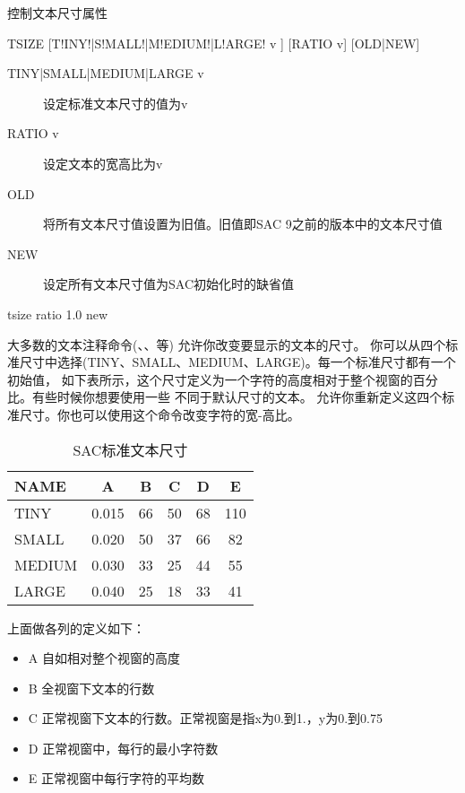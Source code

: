 \label{cmd:tsize}

控制文本尺寸属性

\begin{SACSTX}
TSIZE [T!INY!|S!MALL!|M!EDIUM!|L!ARGE! v ] [RATIO v] [OLD|NEW]
\end{SACSTX}

\begin{description}
\item [TINY|SMALL|MEDIUM|LARGE v] 设定标准文本尺寸的值为v
\item [RATIO v] 设定文本的宽高比为v
\item [OLD] 将所有文本尺寸值设置为旧值。旧值即SAC 9之前的版本中的文本尺寸值
\item [NEW] 设定所有文本尺寸值为SAC初始化时的缺省值
\end{description}

\begin{SACDFT}
tsize ratio 1.0 new
\end{SACDFT}

大多数的文本注释命令(、、等)
允许你改变要显示的文本的尺寸。
你可以从四个标准尺寸中选择(TINY、SMALL、MEDIUM、LARGE)。每一个标准尺寸都有一个初始值，
如下表所示，这个尺寸定义为一个字符的高度相对于整个视窗的百分比。有些时候你想要使用一些
不同于默认尺寸的文本。 允许你重新定义这四个标准尺寸。你也可以使用这个命令改变字符的宽-高比。
\begin{table}[!ht]
\centering
\caption{SAC标准文本尺寸}
\begin{tabular}{lccccc}
\toprule
NAME	&	A	&	B	&	C	&	D	&	E	\\
\midrule
TINY 	& 0.015 &   66 	&  50  	&	68  &	110	\\
SMALL	& 0.020 &	50  &  37  	&	66  &	82	\\
MEDIUM  & 0.030 &	33  &  25  	&	44  &	55	\\
LARGE	& 0.040 &	25  &  18  	&	33  &	41	\\
\bottomrule
\end{tabular}
\end{table}

上面做各列的定义如下：
\begin{itemize}
\item A 自如相对整个视窗的高度
\item B 全视窗下文本的行数
\item C 正常视窗下文本的行数。正常视窗是指x为0.到1.，y为0.到0.75
\item D 正常视窗中，每行的最小字符数
\item E 正常视窗中每行字符的平均数
\end{itemize}

